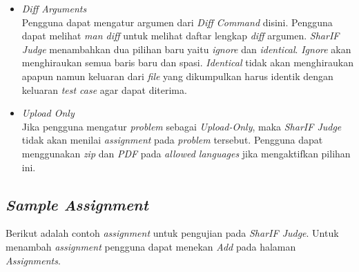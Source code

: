 \begin{itemize}
	\item \textit{Diff Arguments} \\
	Pengguna dapat mengatur argumen dari \textit{Diff Command} disini. Pengguna dapat melihat \textit{man diff} untuk melihat daftar lengkap \textit{diff} argumen. \textit{SharIF Judge} menambahkan dua pilihan baru yaitu \textit{ignore} dan \textit{identical}. \textit{Ignore} akan menghiraukan semua baris baru dan spasi. \textit{Identical} tidak akan menghiraukan apapun namun keluaran dari \textit{file} yang dikumpulkan harus identik dengan keluaran \textit{test case} agar dapat diterima.
	
	\item \textit{Upload Only} \\
	Jika pengguna mengatur \textit{problem} sebagai \textit{Upload-Only}, maka \textit{SharIF Judge} tidak akan menilai \textit{assignment} pada \textit{problem} tersebut. Pengguna dapat menggunakan \textit{zip} dan \textit{PDF} pada \textit{allowed languages} jika mengaktifkan pilihan ini.
	
\end{itemize}

\subsection{\textit{Sample Assignment}}
\label{subsec:sample_assignment}
Berikut adalah contoh \textit{assignment} untuk pengujian pada \textit{SharIF Judge}. Untuk menambah \textit{assignment} pengguna dapat menekan \textit{Add} pada halaman \textit{Assignments}.

